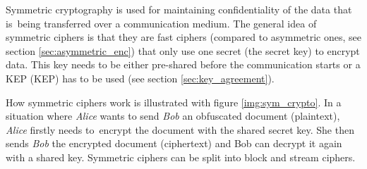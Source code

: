 Symmetric cryptography is used for maintaining confidentiality of the data that is~being transferred over a communication medium. The general idea of symmetric ciphers is that they are fast ciphers (compared to asymmetric ones, see section \ref{sec:asymmetric_enc}) that only use one secret (the secret key) to encrypt data. This key needs to be either pre-shared before the communication starts or a KEP ({\acl{KEP}}) has to be used (see section \ref{sec:key_agreement}). \cite{Ristic2014}

How symmetric ciphers work is illustrated with figure \ref{img:sym_crypto}. In a situation where \textit{Alice} wants to send \textit{Bob} an obfuscated document (plaintext), \textit{Alice} firstly needs to~encrypt the document with the shared secret key. She then sends \textit{Bob} the encrypted document (ciphertext) and Bob can decrypt it again with a shared key. Symmetric ciphers can be split into block and stream ciphers.

